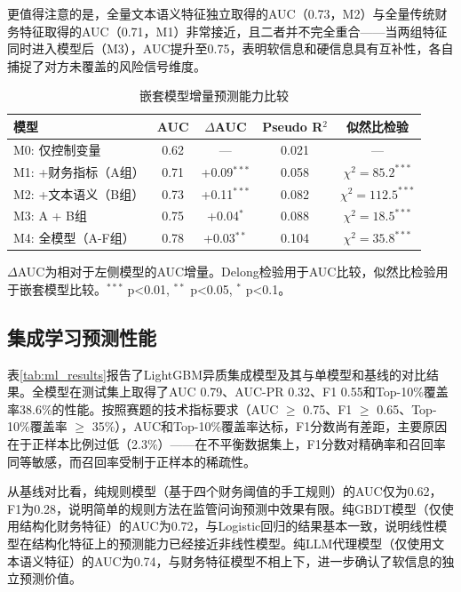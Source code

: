 更值得注意的是，全量文本语义特征独立取得的AUC（0.73，M2）与全量传统财务特征取得的AUC（0.71，M1）非常接近，且二者并不完全重合——当两组特征同时进入模型后（M3），AUC提升至0.75，表明软信息和硬信息具有互补性，各自捕捉了对方未覆盖的风险信号维度。

\begin{table}[H]
\centering
\caption{嵌套模型增量预测能力比较}
\label{tab:incremental}
\begin{threeparttable}
\begin{tabular}{lcccc}
\toprule
模型 & AUC & $\Delta$AUC & Pseudo R$^2$ & 似然比检验 \\
\midrule
M0: 仅控制变量 & 0.62 & --- & 0.021 & --- \\
M1: +财务指标（A组） & 0.71 & +0.09$^{***}$ & 0.058 & $\chi^2=85.2^{***}$ \\
M2: +文本语义（B组） & 0.73 & +0.11$^{***}$ & 0.082 & $\chi^2=112.5^{***}$ \\
M3: A + B组 & 0.75 & +0.04$^{*}$ & 0.088 & $\chi^2=18.5^{***}$ \\
M4: 全模型（A-F组） & 0.78 & +0.03$^{**}$ & 0.104 & $\chi^2=35.8^{***}$ \\
\bottomrule
\end{tabular}
\begin{tablenotes}
\item[注] $\Delta$AUC为相对于左侧模型的AUC增量。Delong检验用于AUC比较，似然比检验用于嵌套模型比较。$^{***}$ p<0.01, $^{**}$ p<0.05, $^{*}$ p<0.1。
\end{tablenotes}
\end{threeparttable}
\end{table}

\subsection{集成学习预测性能}

表\ref{tab:ml_results}报告了LightGBM异质集成模型及其与单模型和基线的对比结果。全模型在测试集上取得了AUC 0.79、AUC-PR 0.32、F1 0.55和Top-10\%覆盖率38.6\%的性能。按照赛题的技术指标要求（AUC $\ge$ 0.75、F1 $\ge$ 0.65、Top-10\%覆盖率 $\ge$ 35\%），AUC和Top-10\%覆盖率达标，F1分数尚有差距，主要原因在于正样本比例过低（2.3\%）——在不平衡数据集上，F1分数对精确率和召回率同等敏感，而召回率受制于正样本的稀疏性。

从基线对比看，纯规则模型（基于四个财务阈值的手工规则）的AUC仅为0.62，F1为0.28，说明简单的规则方法在监管问询预测中效果有限。纯GBDT模型（仅使用结构化财务特征）的AUC为0.72，与Logistic回归的结果基本一致，说明线性模型在结构化特征上的预测能力已经接近非线性模型。纯LLM代理模型（仅使用文本语义特征）的AUC为0.74，与财务特征模型不相上下，进一步确认了软信息的独立预测价值。

